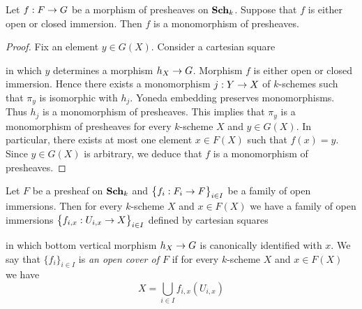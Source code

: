 \begin{proposition}\label{proposition:openclosedimmersionsaremonomorphisms}
Let $f:F\rightarrow G$ be a morphism of presheaves on $\mathbf{Sch}_k$. Suppose that $f$ is either open or closed immersion. Then $f$ is a monomorphism of presheaves.
\end{proposition}
\begin{proof}
Fix an element $y\in G(X)$. Consider a cartesian square
\begin{center}
\end{center}
in which $y$ determines a morphism $h_X\rightarrow G$. Morphism $f$ is either open or closed immersion. Hence there exists a monomorphism $j:Y\rightarrow X$ of $k$-schemes such that $\pi_y$ is isomorphic with $h_j$. Yoneda embedding preserves monomorphisms. Thus $h_j$ is a monomorphism of presheaves. This implies that $\pi_y$ is a monomorphism of presheaves for every $k$-scheme $X$ and $y\in G(X)$. In particular, there exists at most one element $x\in F(X)$ such that $f(x)=y$. Since $y\in G(X)$ is arbitrary, we deduce that $f$ is a monomorphism of presheaves.
\end{proof}

\begin{definition}
Let $F$ be a presheaf on $\mathbf{Sch}_k$ and $\big\{f_i:F_i\rightarrow F\big\}_{i\in I}$ be a family of open immersions. Then for every $k$-scheme $X$ and $x\in F(X)$ we have a family of open immersions $\big\{f_{i,x}:U_{i,x}\rightarrow X\big\}_{i\in I}$ defined by cartesian squares
\begin{center}
\end{center}
in which bottom vertical morphism $h_X\rightarrow G$ is canonically identified with $x$. We say that $\{f_i\}_{i\in I}$ is \textit{an open cover of $F$} if for every $k$-scheme $X$ and $x\in F(X)$ we have
$$X=\bigcup_{i\in I}f_{i,x}\left(U_{i,x}\right)$$
\end{definition}


